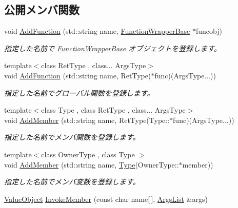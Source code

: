 \subsection*{公開メンバ関数}
\begin{DoxyCompactItemize}
\item 
void \hyperlink{class_reflection_1_1_type_base_abba75a6078449ebf537e1625602faafc}{Add\+Function} (std\+::string name, \hyperlink{class_reflection_1_1_function_wrapper_base}{Function\+Wrapper\+Base} $\ast$funcobj)
\begin{DoxyCompactList}\small\item\em 指定した名前で \hyperlink{class_reflection_1_1_function_wrapper_base}{Function\+Wrapper\+Base} オブジェクトを登録します。\end{DoxyCompactList}\item 
{\footnotesize template$<$class Ret\+Type , class... Args\+Type$>$ }\\void \hyperlink{class_reflection_1_1_type_base_a7bad52367a9d36f0440786e1f7af0443}{Add\+Function} (std\+::string name, Ret\+Type($\ast$func)(Args\+Type...))
\begin{DoxyCompactList}\small\item\em 指定した名前でグローバル関数を登録します。\end{DoxyCompactList}\item 
{\footnotesize template$<$class Type , class Ret\+Type , class... Args\+Type$>$ }\\void \hyperlink{class_reflection_1_1_type_base_ae43bdbe09214e2983eae94c3cbcbb01a}{Add\+Member} (std\+::string name, Ret\+Type(Type\+::$\ast$func)(Args\+Type...))
\begin{DoxyCompactList}\small\item\em 指定した名前でメンバ関数を登録します。\end{DoxyCompactList}\item 
{\footnotesize template$<$class Owner\+Type , class Type $>$ }\\void \hyperlink{class_reflection_1_1_type_base_ae391a46d84cc101c1552e988e91bbd2c}{Add\+Member} (std\+::string name, \hyperlink{class_reflection_1_1_type}{Type}(Owner\+Type\+::$\ast$member))
\begin{DoxyCompactList}\small\item\em 指定した名前でメンバ変数を登録します。\end{DoxyCompactList}\item 
\hyperlink{class_reflection_1_1_value_object}{Value\+Object} \hyperlink{class_reflection_1_1_type_base_ad5b10ddb5430d3a334aff6a06d64bfe1}{Invoke\+Member} (const char name\mbox{[}$\,$\mbox{]}, \hyperlink{_reflector_helper_8hpp_a83512919cd42ea73553f4d173e7ace4c}{Args\+List} \&args)

\end{DoxyCompactItemize}
